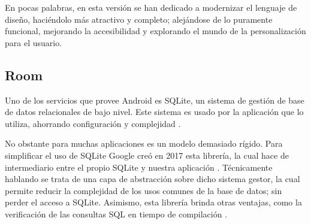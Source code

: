             En pocas palabras, en esta versión se han dedicado a modernizar el lenguaje de diseño, haciéndolo más 
            atractivo y completo; alejándose de lo puramente funcional, mejorando la accesibilidad y explorando 
            el mundo de la personalización para el usuario.

        
        \subsection{Room}
            Uno de los servicios que provee Android es SQLite, un sistema de gestión de base de datos relacionales de 
            bajo nivel. Este sistema es usado por la aplicación que lo utiliza, ahorrando configuración y complejidad
            \cite{recio_persistencia_2019}. 
            
            No obstante para muchas aplicaciones es un modelo demasiado rígido. Para simplificar el uso de SQLite
            Google creó en 2017 esta librería, la cual hace de intermediario entre el propio SQLite y nuestra 
            aplicación \cite{leiva_room_2020}. Técnicamente hablando se trata de una capa de abstracción sobre dicho
            sistema gestor, la cual permite reducir la complejidad de los usos comunes de la base de datos; sin perder
            el acceso a SQLite. Asimismo, esta librería brinda otras ventajas, como la verificación de las consultas
            SQL en tiempo de compilación \cite{noauthor_como_nodate}.


